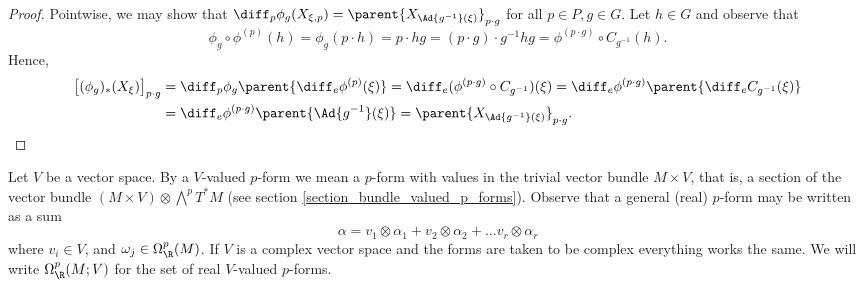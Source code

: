 \begin{proof}
    Pointwise, we may show that \(\diff_p\phi_g(X_{\xi, p})=\parent{X_{\Ad{g^{-1}}(\xi)}}_{p \cdot g}\) for all \(p \in P, g \in G\). Let \(h \in G\) and observe that 
    \[
    \phi_g\circ \phi^{(p)}(h)=\phi_g(p\cdot h)=p\cdot h  g = (p\cdot g)\cdot g^{-1}hg=\phi^{(p\cdot g)}\circ C_{g^{-1}}(h).
    \]
    Hence, 
    \begin{align*}
        \big[(\phi_g)_*(X_{\xi})\big]_{p\cdot g} & = \diff_p\phi_g \parent{\diff_e\phi^{(p)}(\xi)} = \diff_e(\phi^{(p\cdot g)}\circ C_{g^{-1}})(\xi) =\diff_e\phi^{(p\cdot g)}\parent{\diff_e C_{g^{-1}}(\xi)}\\
        & = \diff_e\phi^{(p\cdot g)}\parent{\Ad{g^{-1}}(\xi)}=\parent{X_{\Ad{g^{-1}}(\xi)}}_{p\cdot g}.
    \end{align*}
\end{proof}

Let \(V\) be a vector space. By a \(V\)-valued \(p\)-form we mean a \(p\)-form with values in the trivial vector bundle \(M \times V\), that is, a section of the vector bundle \((M \times V) \otimes \bigwedge^pT^*M\) (see section \ref{section_bundle_valued_p_forms}). Observe that a general (real) \(p\)-form may be written as a sum 
\begin{equation} \label{V_valued_pform}
\alpha=v_1 \otimes \alpha_1+v_2\otimes \alpha_2 + \ldots v_r\otimes \alpha_r
\end{equation}
where \(v_i \in V\), and \(\omega_j \in \Omega^p_\R(M)\). If \(V\) is a complex vector space and the forms are taken to be complex everything works the same. We will write \(\Omega^p_\R(M;V)\) for the set of real \(V\)-valued \(p\)-forms.

